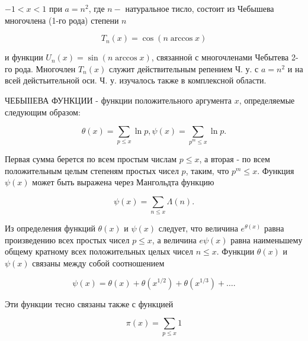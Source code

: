 \documentclass[10pt]{article}
\begin{document}
$-1<x<1$ при $a=n^{2}$, где $n-$ натуральное тисло, состоит из Чебышева многочлена (1-го рода) степени $n$



\[

T_{n}(x)=\cos (n \arccos x)

\]



и функции $U_{n}(x)=\sin (n \arccos x)$, связанноӥ с многочленами Чебытева 2-го рода. Многочлен $T_{n}(x)$ служит действительным репением Ч. у. с $a=n^{2}$ и на всей дейстьительной оси. Ч. у. изучалось также в комплексной области.



ЧЕБЫІІЕВА ФУНКЦИИ - функции положительного аргумента $x$, определяемые следующим образом:



\[

\theta(x)=\sum_{p \leqslant x} \ln p, \psi(x)=\sum_{p^{m} \leqslant x} \ln p .

\]



Первая сумма берется по всем простым числам $p \leqslant x$, а вторая - по всем положительным целым степеням простых чисел $p$, таким, что $p^{m} \leqslant x$. Функция $\psi(x)$ может быть выражена через Мангольдта функцию



\[

\psi(x)=\sum_{n \leqslant x} \Lambda(n) .

\]



Из определения функций $\theta(x)$ и $\psi(x)$ следует, что величина $e^{\theta(x)}$ равна произведению всех простых чисел $p \leqslant x$, а величина $e \psi(x)$ равна наименьшему общему кратному всех положительных целых чисел $n \leqslant x$. Функции $\theta(x)$ и $\psi(x)$ связаны между собой соотношением



\[

\psi(x)=\theta(x)+\theta\left(x^{1 / 2}\right)+\theta\left(x^{1 / 3}\right)+\ldots .

\]



Эти функции тесно связаны также с функцией



\[

\pi(x)=\sum_{p \leqslant x} 1

\]
\end{document}

